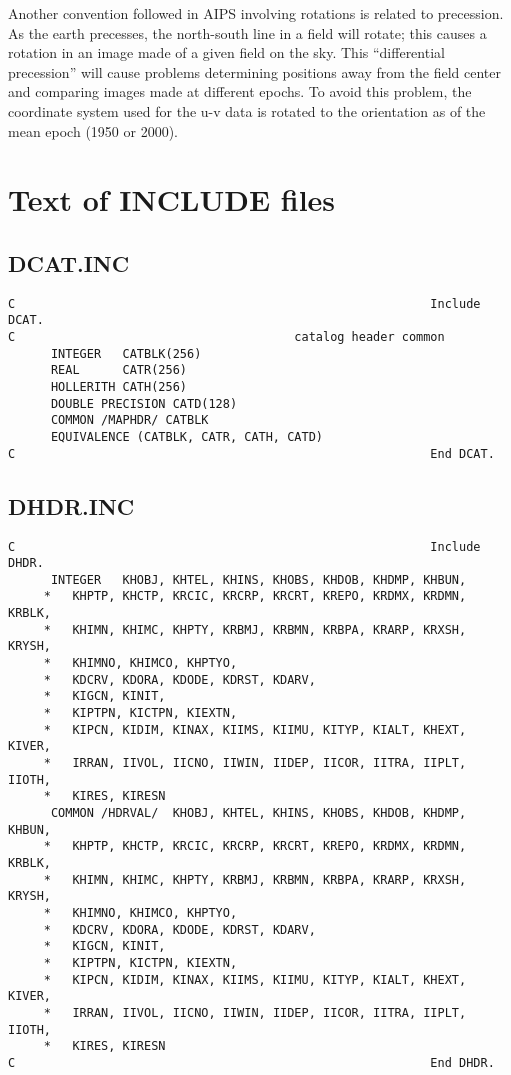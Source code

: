 Another convention followed in AIPS involving rotations is related to
precession.  As the earth precesses, the north-south line in a field
will rotate; this causes a rotation in an image made of a given field
on the sky.  This ``differential precession'' will cause problems
determining positions away from the field center and comparing images
made at different epochs.  To avoid this problem, the coordinate
system used for the u-v data is rotated to the orientation as of the
mean epoch (1950 or 2000).


\section{Text of INCLUDE files}
\subsection{DCAT.INC}

\begin{verbatim}
C                                                          Include DCAT.
C                                       catalog header common
      INTEGER   CATBLK(256)
      REAL      CATR(256)
      HOLLERITH CATH(256)
      DOUBLE PRECISION CATD(128)
      COMMON /MAPHDR/ CATBLK
      EQUIVALENCE (CATBLK, CATR, CATH, CATD)
C                                                          End DCAT.

\end{verbatim}
\subsection{DHDR.INC}

\begin{verbatim}
C                                                          Include DHDR.
      INTEGER   KHOBJ, KHTEL, KHINS, KHOBS, KHDOB, KHDMP, KHBUN,
     *   KHPTP, KHCTP, KRCIC, KRCRP, KRCRT, KREPO, KRDMX, KRDMN, KRBLK,
     *   KHIMN, KHIMC, KHPTY, KRBMJ, KRBMN, KRBPA, KRARP, KRXSH, KRYSH,
     *   KHIMNO, KHIMCO, KHPTYO,
     *   KDCRV, KDORA, KDODE, KDRST, KDARV,
     *   KIGCN, KINIT,
     *   KIPTPN, KICTPN, KIEXTN,
     *   KIPCN, KIDIM, KINAX, KIIMS, KIIMU, KITYP, KIALT, KHEXT, KIVER,
     *   IRRAN, IIVOL, IICNO, IIWIN, IIDEP, IICOR, IITRA, IIPLT, IIOTH,
     *   KIRES, KIRESN
      COMMON /HDRVAL/  KHOBJ, KHTEL, KHINS, KHOBS, KHDOB, KHDMP, KHBUN,
     *   KHPTP, KHCTP, KRCIC, KRCRP, KRCRT, KREPO, KRDMX, KRDMN, KRBLK,
     *   KHIMN, KHIMC, KHPTY, KRBMJ, KRBMN, KRBPA, KRARP, KRXSH, KRYSH,
     *   KHIMNO, KHIMCO, KHPTYO,
     *   KDCRV, KDORA, KDODE, KDRST, KDARV,
     *   KIGCN, KINIT,
     *   KIPTPN, KICTPN, KIEXTN,
     *   KIPCN, KIDIM, KINAX, KIIMS, KIIMU, KITYP, KIALT, KHEXT, KIVER,
     *   IRRAN, IIVOL, IICNO, IIWIN, IIDEP, IICOR, IITRA, IIPLT, IIOTH,
     *   KIRES, KIRESN
C                                                          End DHDR.

\end{verbatim}
